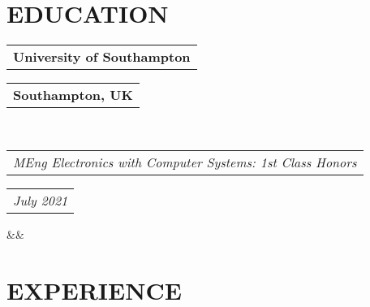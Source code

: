 \documentclass[11pt,a4paper,roman]{moderncv}        %
\makeatletter
\newcommand*{\customcventry}[7][.25em]{
  \begin{tabular}{@{}l} 
    {\bfseries #4}
  \end{tabular}
  \hfill%
  \begin{tabular}{l@{}}
     {\bfseries #5}
  \end{tabular} \\
  \begin{tabular}{@{}l} 
    {\itshape #3}
  \end{tabular}
  \hfill%
  \begin{tabular}{l@{}}
     {\itshape #2}
  \end{tabular}
  \ifx&#7&%
  \else{\\%
    \begin{minipage}{\maincolumnwidth}%
      \small#7%
    \end{minipage}}\fi%
  \par\addvspace{#1}}
\makeatother
\begin{document}



\section{EDUCATION}
{\customcventry{July 2021}{MEng Electronics with Computer Systems: 1st Class Honors}{University of Southampton}{Southampton, UK}{}{}}




\section{EXPERIENCE}
\end{document}
